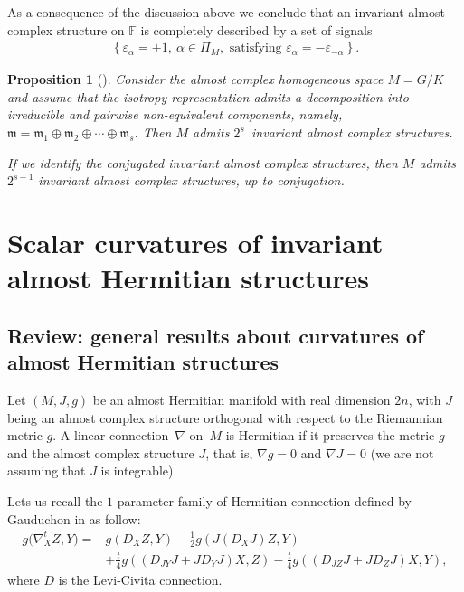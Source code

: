\documentclass[pdftex]{sigma}%
\numberwithin{equation}{section}
\newtheorem{Proposition}[Theorem]{Proposition}
 { \theoremstyle{definition}
\newtheorem{Definition}[Theorem]{Definition}
\newtheorem{Question}[Theorem]{Question}
\newtheorem*{Notation}{Notation}
\newtheorem{Example}[Theorem]{Example}
\newtheorem{Remark}[Theorem]{Remark} }
\begin{document}
As a consequence of the discussion above we conclude that an invariant almost complex structure on $\mathbb{F}$ is completely described by a set of signals
\begin{gather*}
\left\{\varepsilon_{\alpha}=\pm 1, \ \alpha\in \Pi_M, \text{ satisfying } \varepsilon_{\alpha}=-\varepsilon_{-\alpha}\right\}.
\end{gather*}

\begin{Proposition}[{\cite[Proposition~13.4]{opa}}]%
Consider the almost complex homogeneous space \mbox{$M=G/K$} and assume that the isotropy representation admits a decomposition into irreducible and pairwise non-equivalent components, namely, $\mathfrak{m}=\mathfrak{m}_{1}\oplus\mathfrak{m}_{2}\oplus\cdots\oplus\mathfrak{m}_{s}$. Then $M$ admits $2^{s}$~invariant almost complex structures.

If we identify the conjugated invariant almost complex structures, then $M$ admits $2^{s-1}$ invariant almost complex structures, up to conjugation.
\end{Proposition}

\section{Scalar curvatures of invariant almost Hermitian structures }\label{scal-hermit}

\subsection{Review: general results about curvatures of almost Hermitian structures}
Let $(M,J,g)$ be an almost Hermitian manifold with real dimension $2n$, with $J$ being an almost complex structure orthogonal with respect to the Riemannian metric $g$. A linear connection~$\nabla$ on~$M$ is Hermitian if it preserves the metric $g$ and the almost complex structure $J$, that is, $\nabla g=0$ and $\nabla J=0$ (we are not assuming that $J$ is integrable).

Lets us recall the $1$-parameter family of Hermitian connection defined by Gauduchon in \cite{gau} as follow:{\samepage
\begin{align*}
g\big(\nabla^{t}_{X}Z,Y\big)={}&g(D_{X}Z,Y)-\frac{1}{2}g(J(D_{X}J)Z,Y)
\\
&+\frac{t}{4}g((D_{JY}J+JD_{Y}J)X,Z)-\frac{t}{4}g((D_{JZ}J+JD_{Z}J)X,Y),
\end{align*}
where $D$ is the Levi-Civita connection.}
\end{document}
